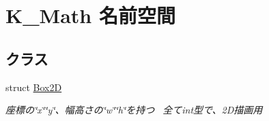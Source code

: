 \hypertarget{namespace_k___math}{}\section{K\+\_\+\+Math 名前空間}
\label{namespace_k___math}
\subsection*{クラス}
\begin{DoxyCompactItemize}
\item 
struct \mbox{\hyperlink{struct_k___math_1_1_box2_d}{Box2D}}
\begin{DoxyCompactList}\small\item\em 座標の\char`\"{}x\char`\"{}\char`\"{}y\char`\"{}、幅高さの\char`\"{}w\char`\"{}\char`\"{}h\char`\"{}を持つ~\newline
全てint型で、2\+D描画用 \end{DoxyCompactList}\end{DoxyCompactItemize}
